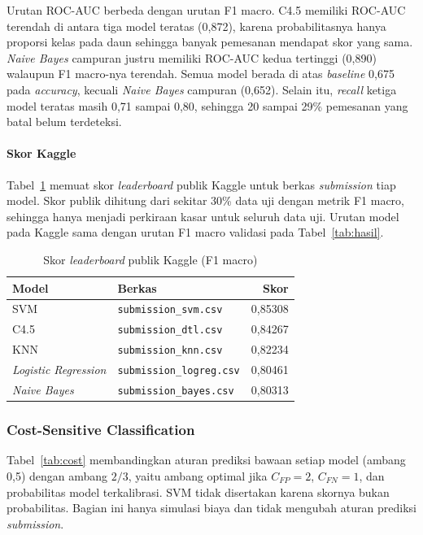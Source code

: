 Urutan ROC-AUC berbeda dengan urutan F1 macro. C4.5 memiliki ROC-AUC
terendah di antara tiga model teratas (0,872), karena probabilitasnya hanya
proporsi kelas pada daun sehingga banyak pemesanan mendapat skor yang
sama. \textit{Naive Bayes} campuran justru memiliki ROC-AUC kedua tertinggi
(0,890) walaupun F1 macro-nya terendah. Semua model berada di atas
\textit{baseline} 0,675 pada \textit{accuracy}, kecuali \textit{Naive Bayes}
campuran (0,652). Selain itu, \textit{recall} ketiga model teratas masih 0,71
sampai 0,80, sehingga 20 sampai 29\% pemesanan yang batal belum terdeteksi.

\paragraph{Skor Kaggle}
Tabel~\ref{tab:kaggle} memuat skor \textit{leaderboard} publik Kaggle untuk
berkas \textit{submission} tiap model. Skor publik dihitung dari sekitar 30\%
data uji dengan metrik F1 macro, sehingga hanya menjadi perkiraan kasar untuk
seluruh data uji. Urutan model pada Kaggle sama dengan urutan F1 macro
validasi pada Tabel~\ref{tab:hasil}.

\begin{table}[H]
\centering
\small
\caption{Skor \textit{leaderboard} publik Kaggle (F1 macro)}
\label{tab:kaggle}
\begin{tabular}{@{}llr@{}}
\toprule
Model & Berkas & Skor \\
\midrule
SVM & \texttt{submission\_svm.csv} & 0,85308 \\
C4.5 & \texttt{submission\_dtl.csv} & 0,84267 \\
KNN & \texttt{submission\_knn.csv} & 0,82234 \\
\textit{Logistic Regression} & \texttt{submission\_logreg.csv} & 0,80461 \\
\textit{Naive Bayes} & \texttt{submission\_bayes.csv} & 0,80313 \\
\bottomrule
\end{tabular}
\end{table}

\subsubsection{Cost-Sensitive Classification}

Tabel~\ref{tab:cost} membandingkan aturan prediksi bawaan setiap model
(ambang 0,5) dengan ambang $2/3$, yaitu ambang optimal jika $C_{FP}=2$,
$C_{FN}=1$, dan probabilitas model terkalibrasi. SVM tidak disertakan karena
skornya bukan probabilitas. Bagian ini hanya simulasi biaya dan tidak
mengubah aturan prediksi \textit{submission}.


